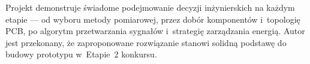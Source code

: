 \documentclass[a4paper,11pt]{article}
\begin{document}
Projekt demonstruje świadome podejmowanie decyzji inżynierskich na każdym
etapie --- od wyboru metody pomiarowej, przez dobór komponentów i~topologię
PCB, po algorytm przetwarzania sygnałów i~strategię zarządzania energią.
Autor jest przekonany, że zaproponowane rozwiązanie stanowi solidną podstawę
do budowy prototypu w~Etapie~2 konkursu.
\end{document}
